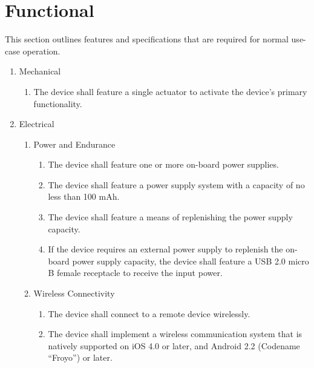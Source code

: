 \documentclass[twoside]{article}
\begin{document}
\section{Functional}
This section outlines features and specifications that are required for normal use-case operation.
\begin{enumerate}

\item Mechanical
  \begin{enumerate}
  
  \item The device shall feature a single actuator to activate the device's primary functionality.

  \end{enumerate}

\item Electrical
  \begin{enumerate}

  \item Power and Endurance
    \begin{enumerate}

    \item The device shall feature one or more on-board power supplies.

    \item The device shall feature a power supply system with a capacity of no less than 100 mAh.
	
    \item The device shall feature a means of replenishing the power supply capacity.

    \item If the device requires an external power supply to replenish the on-board power supply capacity, the device shall feature a USB 2.0 micro B female receptacle to receive the input power.

    \end{enumerate}

  \item Wireless Connectivity

    \begin{enumerate}

    \item The device shall connect to a remote device wirelessly.

    \item The device shall implement a wireless communication system that is natively supported on iOS 4.0 or later, and Android 2.2 (Codename ``Froyo'') or later.


\end{enumerate}
\end{enumerate}
\end{enumerate}
\end{document}
